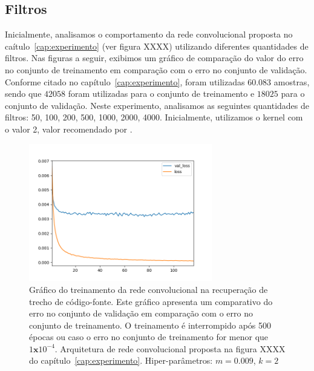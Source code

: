 \subsection{Filtros}

Inicialmente, analisamos o comportamento da rede convolucional proposta no caítulo~\ref{cap:experimento} (ver figura XXXX) utilizando diferentes quantidades de filtros. Nas figuras a seguir, exibimos um gráfico de comparação do valor do erro no conjunto de treinamento em comparação com o erro no conjunto de validação. Conforme citado no capítulo~\ref{cap:experimento}, foram utilizadas $60.083$ amostras, sendo que $42058$ foram utilizadas para o conjunto de treinamento e $18025$ para o conjunto de validação. Neste experimento, analisamos as seguintes quantidades de filtros: 50, 100, 200, 500, 1000, 2000, 4000. Inicialmente, utilizamos o kernel com o valor 2, valor recomendado por \cite{tan-lstm-qa}.


\begin{figure}[h]
\includegraphics[width=8cm]{figuras/ape-ajustes-hiper-parametros/training-cnn-1000-k-2.png}
\caption{Gráfico do treinamento da rede convolucional na recuperação de trecho de código-fonte. Este gráfico apresenta um comparativo do erro no conjunto de validação em comparação com o erro no conjunto de treinamento. O treinamento é interrompido após 500 épocas ou caso o erro no conjunto de treinamento for menor que $1\mathbf{x}10^{-4}$. Arquitetura de rede convolucional proposta na figura XXXX do capítulo~\ref{cap:experimento}. Hiper-parâmetros: $m = 0.009$, $k = 2$}
\label{fig:ape-cnn-1000-k-2}
\end{figure}

